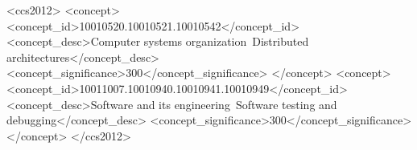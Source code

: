 \documentclass[sigplan,10pt,anonymous,review]{acmart}
\begin{document}
\begin{CCSXML}
<ccs2012>
 <concept>
  <concept_id>10010520.10010521.10010542</concept_id>
  <concept_desc>Computer systems organization~Distributed architectures</concept_desc>
  <concept_significance>300</concept_significance>
 </concept>
 <concept>
  <concept_id>10011007.10010940.10010941.10010949</concept_id>
  <concept_desc>Software and its engineering~Software testing and debugging</concept_desc>
  <concept_significance>300</concept_significance>
 </concept>
</ccs2012>
\end{CCSXML}

\maketitle













\end{document}
